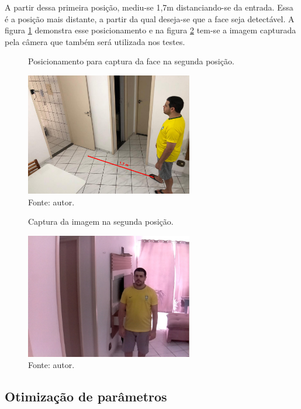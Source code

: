 A partir dessa primeira posição, mediu-se 1,7m distanciando-se da entrada. Essa é a posição mais distante, a partir da qual deseja-se que a face seja detectável. A figura \ref{fig:cena2_posicao2_visao_externa} demonstra esse posicionamento e na figura \ref{fig:cena2_posicao2_imagem_capturada} tem-se a imagem capturada pela câmera que também será utilizada nos testes.
\begin{figure}[H]
    \centering
    \caption[Posicionamento para captura da face na segunda posição.]{Posicionamento para captura da face na segunda posição.}
    \includegraphics[width=0.65\textwidth]{Cap4_Experimentos_Realizados/Figures/cena2_posicao2_visao_externa.jpg}
    \caption*{Fonte: autor.}
    \label{fig:cena2_posicao2_visao_externa}
\end{figure}

\begin{figure}[H]
    \centering
    \caption[Captura da imagem na segunda posição.]{Captura da imagem na segunda posição.}
    \includegraphics[width=0.65\textwidth]{Cap4_Experimentos_Realizados/Figures/cena2_posicao2_imagem_capturada.jpg}
    \caption*{Fonte: autor.}
    \label{fig:cena2_posicao2_imagem_capturada}
\end{figure}


\subsection{Otimização de parâmetros}

